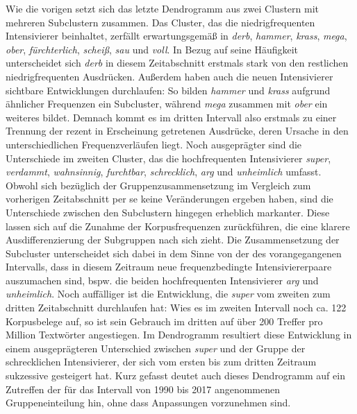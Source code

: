 \noindent Wie die vorigen setzt sich das letzte Dendrogramm aus zwei Clustern mit mehreren Subclustern zusammen. Das Cluster, das die niedrigfrequenten Intensivierer beinhaltet, zerfällt erwartungsgemäß in \textit{derb}, \textit{hammer}, \textit{krass}, \textit{mega}, \textit{ober}, \textit{fürchterlich}, \textit{scheiß}, \textit{sau} und \textit{voll}. In Bezug auf seine Häufigkeit unterscheidet sich \textit{derb} in diesem Zeitabschnitt erstmals stark von den restlichen niedrigfrequenten Ausdrücken. Außerdem haben auch die neuen Intensivierer sichtbare Entwicklungen durchlaufen: So bilden \textit{hammer} und \textit{krass} aufgrund ähnlicher Frequenzen ein Subcluster, während \textit{mega} zusammen mit \textit{ober} ein weiteres bildet. Demnach kommt es im dritten Intervall also erstmals zu einer Trennung der rezent in Erscheinung getretenen Ausdrücke, deren Ursache in den unterschiedlichen Frequenzverläufen liegt. Noch ausgeprägter sind die Unterschiede im zweiten Cluster, das die hochfrequenten Intensivierer \textit{super}, \textit{verdammt}, \textit{wahnsinnig}, \textit{furchtbar}, \textit{schrecklich}, \textit{arg} und \textit{unheimlich} umfasst. Obwohl sich bezüglich der Gruppenzusammensetzung im Vergleich zum vorherigen Zeitabschnitt per se keine Veränderungen ergeben haben, sind die Unterschiede zwischen den Subclustern hingegen erheblich markanter. Diese lassen sich auf die Zunahme der Korpusfrequenzen zurückführen, die eine klarere Ausdifferenzierung der Subgruppen nach sich zieht. Die Zusammensetzung der Subcluster unterscheidet sich dabei in dem Sinne von der des vorangegangenen Intervalls, dass in diesem Zeitraum neue frequenzbedingte Intensiviererpaare auszumachen sind, bspw. die beiden hochfrequenten Intensivierer \textit{arg} und \textit{unheimlich}. Noch auffälliger ist die Entwicklung, die \textit{super} vom zweiten zum dritten Zeitabschnitt durchlaufen hat: Wies es im zweiten Intervall noch ca. 122 Korpusbelege auf, so ist sein Gebrauch im dritten auf über 200 Treffer pro Million Textwörter angestiegen. Im Dendrogramm resultiert diese Entwicklung in einem ausgeprägteren Unterschied zwischen \textit{super} und der Gruppe der \glqq{}schrecklichen\grqq{} Intensivierer, der sich vom ersten bis zum dritten Zeitraum sukzessive gesteigert hat. Kurz gefasst deutet auch dieses Dendrogramm auf ein Zutreffen der für das Intervall von 1990 bis 2017 angenommenen Gruppeneinteilung hin, ohne dass Anpassungen vorzunehmen sind.

